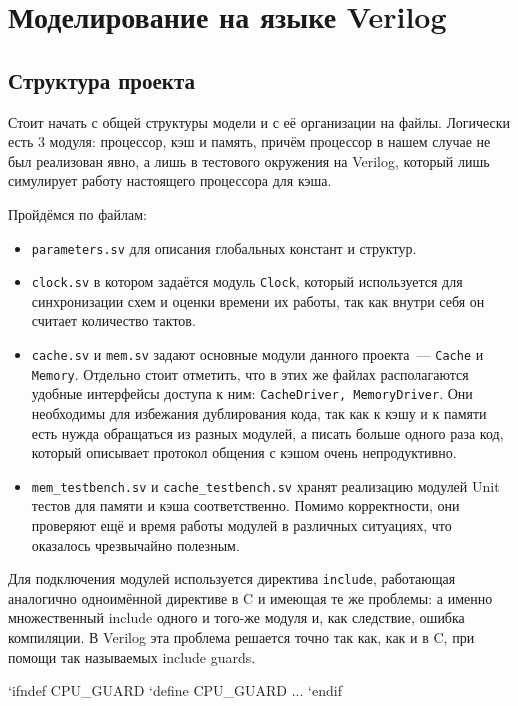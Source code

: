 \documentclass[14pt, russian, onesize]{extreport}
\begin{document}
\section*{ Моделирование на языке Verilog }
\subsection*{ Структура проекта }
Стоит начать с общей структуры модели и с её организации на
файлы. Логически есть 3 модуля: процессор, кэш и память,
причём процессор в нашем случае не был реализован явно, а лишь в
тестового окружения на Verilog, который лишь 
симулирует работу настоящего процессора для кэша.

Пройдёмся по файлам: 
\begin{itemize}
    \item 
        \texttt{parameters.sv} для описания глобальных констант
        и структур.
    \item
        \texttt{clock.sv} в котором задаётся
        модуль \texttt{Clock}, который используется
        для синхронизации схем и оценки времени их работы, так как
        внутри себя он считает количество тактов.
    \item 
       \texttt{cache.sv} и \texttt{mem.sv} задают основные 
       модули данного проекта~--- \texttt{Cache} и \texttt{Memory}. Отдельно
       стоит отметить, что в этих же файлах располагаются
       удобные интерфейсы доступа к ним: \texttt{CacheDriver, MemoryDriver}.
       Они необходимы для избежания дублирования кода, так как
       к кэшу и к памяти есть нужда обращаться из разных
       модулей, а писать больше одного раза код, который 
       описывает протокол общения с кэшом очень непродуктивно. 
    \item 
        \texttt{mem\_testbench.sv} и \texttt{cache\_testbench.sv}
        хранят реализацию модулей Unit тестов для памяти и кэша 
        соответственно.
        Помимо корректности, они проверяют ещё и время работы 
        модулей в различных ситуациях, что оказалось чрезвычайно полезным.
\end{itemize}

Для подключения модулей используется директива \texttt{include}, работающая
аналогично одноимённой директиве в C и имеющая те же проблемы: а именно
множественный include одного и того-же модуля и, как следствие,
ошибка компиляции. В Verilog эта проблема решается точно
так как, как и в C, при помощи так называемых include guards.
\begin{svcode}
`ifndef CPU_GUARD
`define CPU_GUARD
...
`endif
\end{svcode}
\end{document}
